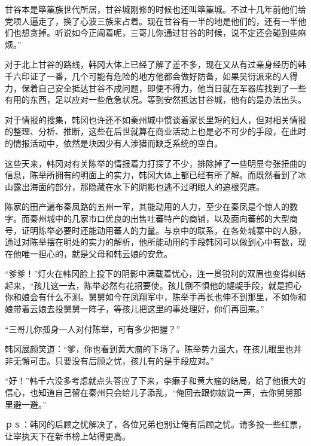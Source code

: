 甘谷本是筚篥族世代所居，甘谷城刚修的时候也还叫筚篥城。不过十几年前他们给党项人逼走了，换了心波三族来占着。现在甘谷有一半的地是他们的，还有一半他们也想贪掉。听说如今正闹着呢，三哥儿你通过甘谷的时候，说不定还会碰到些麻烦。”

对于北上甘谷的路线，韩冈大体上已经了解了差不多，现在又从有过亲身经历的韩千六印证了一番，几个可能有危险的地方他都会做好防备，如果吴衍派来的人得力，保着自己安全抵达甘谷不成问题，即便不得力，他当日就在军器库找到了一些有用的东西，足以应对一些危急状况。等到安然抵达甘谷城，他有的是办法出头。

对于情报的搜集，韩冈也许还不如秦州城中惯谈着家长里短的妇人，但对相关情报的整理、分析、推断，这些在后世就算在商业活动上也是必不可少的手段，在此时的情报活动中，依然是块因少有人涉猎而缺乏系统的空白。

这些天来，韩冈对有关陈举的情报着力打探了不少，排除掉了一些明显夸张扭曲的信息，陈举所拥有的明面上的实力，韩冈大体上都已经有所了解。而既然看到了冰山露出海面的部分，那隐藏在水下的阴影也逃不过明眼人的追根究底。

陈家的田产遍布秦凤路的五州一军，其能动用的人力，至少在秦凤是个惊人的数字。而秦州城中的几家市口优良的出售吐蕃特产的商铺，以及面向蕃部的大型商号，证明陈举必要时还能动用蕃人的力量。与京中的联系，在各处城寨中的人脉，通过对陈举摆在明处的实力的解析，他所能动用的手段韩冈可以做到心中有数，现在他唯一担心的，就是父母和韩云娘的安危。

“爹爹！”灯火在韩冈脸上投下的阴影中满载着忧心，连一贯锐利的双眉也变得纠结起来，“孩儿这一去，陈举必然有花招要使。孩儿倒不惧他的龌龊手段，就是担心你和娘会有什么不测。舅舅如今在凤翔军中，陈举手再长也伸不到那里，不如你和娘带着云娘去投舅舅一阵子，等孩儿把这里的事处理好，你们再回来。”

“三哥儿你孤身一人对付陈举，可有多少把握？”

韩冈展颜笑道：“爹，你也看到黄大瘤的下场了。陈举势力虽大，在孩儿眼里也并非无懈可击。只要没有后顾之忧，孩儿有的是手段应对。”

“好！”韩千六没多考虑就点头答应了下来，李癞子和黄大瘤的结局，给了他很大的信心，也知道自己留在秦州只会给儿子添乱，“俺回去跟你娘说一声，去你舅舅那里避一避。”

ｐｓ：韩冈的后顾之忧解决了，各位兄弟也别让俺有后顾之忧。请多投一些红票，让宰执天下在新书榜上站得更高。


